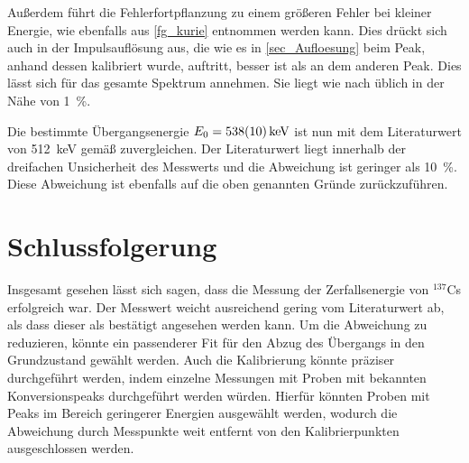 \documentclass[
	a4paper,
	12pt,
	pagesize,
	ngerman
]{scrartcl}
\begin{document}
	Außerdem führt die Fehlerfortpflanzung zu einem größeren Fehler bei kleiner Energie, wie ebenfalls aus \cref{fg_kurie} entnommen werden kann.
	Dies drückt sich auch in der Impulsauflösung aus, die wie es in \cref{sec_Aufloesung} beim Peak, anhand dessen kalibriert wurde, auftritt, besser ist als an dem anderen Peak.
	Dies lässt sich für das gesamte Spektrum annehmen.
	Sie liegt wie nach \cite{Anleitung} üblich in der Nähe von \SI{1}{\percent}.

	Die bestimmte Übergangsenergie $E_0=\SI{538+-10}{keV}$ ist nun mit dem Literaturwert von \SI{512}{keV} gemäß \cite{Leifi} zuvergleichen.
	Der Literaturwert liegt innerhalb der dreifachen Unsicherheit des Messwerts und die Abweichung ist geringer als \SI{10}{\percent}.
	Diese Abweichung ist ebenfalls auf die oben genannten Gründe zurückzuführen.



	\section{Schlussfolgerung}
	Insgesamt gesehen lässt sich sagen, dass die Messung der Zerfallsenergie von $^{137}$Cs erfolgreich war.
	Der Messwert weicht ausreichend gering vom Literaturwert ab, als dass dieser als bestätigt angesehen werden kann.
	Um die Abweichung zu reduzieren, könnte ein passenderer Fit für den Abzug des Übergangs in den Grundzustand gewählt werden.
	Auch die Kalibrierung könnte präziser durchgeführt werden, indem einzelne Messungen mit Proben mit bekannten Konversionspeaks durchgeführt werden würden.
	Hierfür könnten Proben mit Peaks im Bereich geringerer Energien ausgewählt werden, wodurch die Abweichung durch Messpunkte weit entfernt von den Kalibrierpunkten ausgeschlossen werden.

	\printbibliography
\end{document}
